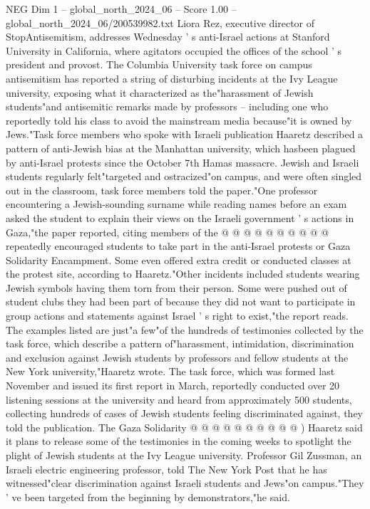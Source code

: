 \begin{textsample}{NEG Dim 1 – global\_north\_2024\_06 – Score 1.00 – global\_north\_2024\_06/200539982.txt}  \label{ex:f1_neg_210}
Liora Rez, executive director of StopAntisemitism, addresses Wednesday ' s anti-Israel actions at Stanford University in California, where agitators occupied the offices of the school ' s president and provost.
The Columbia University task force on campus antisemitism has reported a string of disturbing incidents at the Ivy League university, exposing what it characterized as the"harassment of Jewish students"and antisemitic remarks made by professors -- including one who reportedly told his class to avoid the mainstream media because"it is owned by Jews."Task force members who spoke with Israeli publication Haaretz described a pattern of anti-Jewish bias at the Manhattan university, which hasbeen plagued by anti-Israel protests since the October 7th Hamas massacre.
Jewish and Israeli students regularly felt"targeted and ostracized"on campus, and were often singled out in the classroom, task force members told the paper."One professor encountering a Jewish-sounding surname while reading names before an exam asked the student to explain their views on the Israeli government ' s actions in Gaza,"the paper reported, citing members of the @ @ @ @ @ @ @ @ @ @ repeatedly encouraged students to take part in the anti-Israel protests or Gaza Solidarity Encampment.
Some even offered extra credit or conducted classes at the protest site, according to Haaretz."Other incidents included students wearing Jewish symbols having them torn from their person.
Some were pushed out of student clubs they had been part of because they did not want to participate in group actions and statements against Israel ' s right to exist,"the report reads.
The examples listed are just"a few"of the hundreds of testimonies collected by the task force, which describe a pattern of"harassment, intimidation, discrimination and exclusion against Jewish students by professors and fellow students at the New York university,"Haaretz wrote.
The task force, which was formed last November and issued its first report in March, reportedly conducted over 20 listening sessions at the university and heard from approximately 500 students, collecting hundreds of cases of Jewish students feeling discriminated against, they told the publication.
The Gaza Solidarity @ @ @ @ @ @ @ @ @ @ ) Haaretz said it plans to release some of the testimonies in the coming weeks to spotlight the plight of Jewish students at the Ivy League university.
Professor Gil Zussman, an Israeli electric engineering professor, told The New York Post that he has witnessed"clear discrimination against Israeli students and Jews"on campus."They ' ve been targeted from the beginning by demonstrators,"he said.

\end{textsample}
